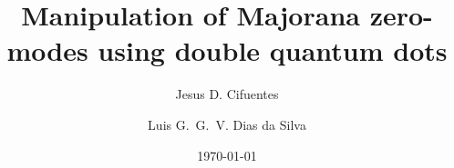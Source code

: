 \documentclass[showpacs,aps,prb,reprint,superscriptaddress]{revtex4-1}
\begin{document}
\newcommand{\be}   {\begin{equation}}
\newcommand{\ee}   {\end{equation}}
\newcommand{\ba}   {\begin{eqnarray}}
\newcommand{\ea}   {\end{eqnarray}}
\newcommand{\ve}  {\varepsilon}

\newcommand{\nhat}{\hat{n}}
\newcommand{\veck}{\textbf{k}}
\newcommand\ep{\epsilon}
\newcommand\g{\gamma}
\newcommand\s{\sigma}
\newcommand\up{\uparrow}
\newcommand\dw{\downarrow}
\newcommand\down{\downarrow}
\newcommand{\ed}[1]{\ep_{d#1}}
\newcommand{\ket}[1]{\vert #1 \rangle}
\newcommand{\ann}{a^{\dagger}}
\newcommand{\dann}{d^{\dagger}}
\newcommand{\tdots}{t_{dots}}
\newcommand{\gammaA}[1]{\gamma_{A,#1}}
\newcommand{\gammaB}[1]{\gamma_{B,#1}}
\newcommand{\Green}[1]{G_{#1}(\omega) }

\newcommand{\GreenG}[2]{G_{#1}^{ #2} (\omega) }

\newcommand{\super}{\vert \Delta \vert}





\title{ Manipulation of Majorana zero-modes using double quantum dots }

\author{Jesus D. Cifuentes}
\author{Luis G.~G.~V. Dias da Silva}

\date{ \today }
\end{document}
